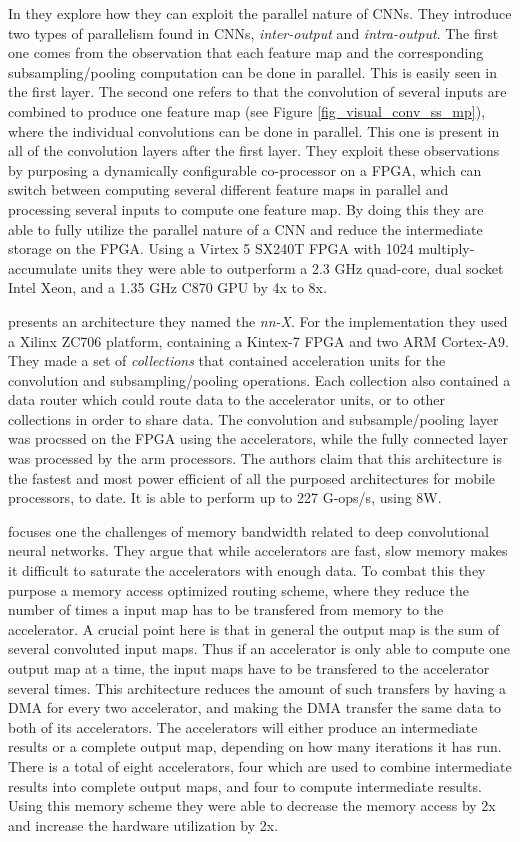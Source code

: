 In \cite{Chakradhar2010} they explore how they can exploit  the parallel nature of CNNs. They introduce two types of parallelism found in CNNs, \textit{inter-output} and \textit{intra-output}. The first one comes from the observation that each feature map and the corresponding subsampling/pooling computation can be done in parallel. This is easily seen in the first layer. The second one refers to that the convolution of several inputs are combined to produce one feature map (see Figure \ref{fig_visual_conv_ss_mp}), where the individual convolutions can be done in parallel. This one is present in all of the convolution layers after the first layer. They exploit these observations by purposing a dynamically configurable co-processor on a FPGA, which can switch between computing several different feature maps in parallel and processing several inputs to compute one feature map. By doing this they are able to fully utilize the parallel nature of a CNN and reduce the intermediate storage on the FPGA. Using a Virtex 5 SX240T FPGA with 1024 multiply-accumulate units they were able to outperform  a 2.3 GHz quad-core, dual socket Intel Xeon, and a 1.35 GHz C870 GPU by 4x to 8x. 

\cite{Paper} presents an architecture they named the \textit{nn-X}. For the implementation they used a Xilinx ZC706 platform, containing a Kintex-7 FPGA and two ARM Cortex-A9. They made a set of \textit{collections} that contained acceleration units for the convolution and subsampling/pooling operations. Each collection also contained a data router which could route data to the accelerator units, or to other collections in order to share data. The convolution and subsample/pooling layer was procssed on the FPGA using the accelerators, while the fully connected layer was processed by the arm processors. The authors claim that this architecture is the fastest and most power efficient of all the purposed architectures for mobile processors, to date. It is able to perform up to 227 G-ops/s, using 8W.  

\cite{Dundar2014} focuses one the challenges of memory bandwidth related to deep convolutional neural networks. They argue that while accelerators are fast, slow memory makes it difficult to saturate the accelerators with enough data. To combat this they purpose a memory access optimized routing scheme, where they reduce the number of times a input map has to be transfered from memory to the accelerator. A crucial point here is that in general the output map is the sum of several convoluted input maps. Thus if an accelerator is only able to compute one output map at a time, the input maps have to be transfered to the accelerator several times. This architecture reduces the amount of such transfers by having a DMA for every two accelerator, and making the DMA transfer the same data to both of its accelerators. The accelerators will either produce an intermediate results or a complete output map, depending on how many iterations it has run. There is a total of eight accelerators, four which are used to combine intermediate results into complete output maps, and four to compute intermediate results. Using this memory scheme they were able to decrease the memory access by 2x and increase the hardware utilization by 2x. 


